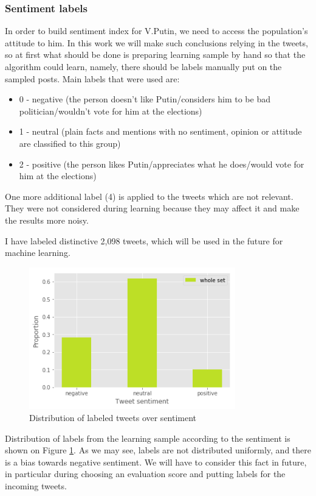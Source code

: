 \documentclass[12pt,a4paper]{article}
\begin{document}
\subsubsection{Sentiment labels}
In order to build sentiment index for V.Putin, we need to access the population's attitude to him. In this work we will make such conclusions relying in the tweets, so at first what should be done is preparing learning sample by hand so that the algorithm could learn, namely, there should be labels manually put on the sampled posts. Main labels that were used are:
\begin{itemize}
\item 0 - negative (the person doesn't like Putin/considers him to be bad politician/wouldn't vote for him at the elections)
\item 1 - neutral (plain facts and mentions with no sentiment, opinion or attitude are classified to this group)
\item 2 - positive (the person likes Putin/appreciates what he does/would vote for him at the elections)
\end{itemize}

One more additional label (4) is applied to the tweets which are not relevant. They were not considered during learning because they may affect it and make the results more noisy.

I have labeled distinctive 2,098 tweets, which will be used in the future for machine learning.
\newline
\begin{figure}
\centering
\includegraphics[width=0.8\textwidth]{figures/label_distr.png}
\caption{Distribution of labeled tweets over sentiment}
\label{fig:label_distr}
\end{figure}

Distribution of labels from the learning sample according to the sentiment is shown on Figure \ref{fig:label_distr}. As we may see, labels are not distributed uniformly, and there is a bias towards negative sentiment. We will have to consider this fact in future, in particular during choosing an evaluation score and putting labels for the incoming tweets.
\end{document}
